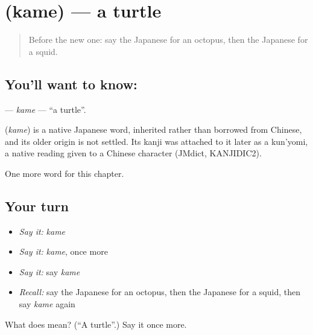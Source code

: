 \section[\texorpdfstring{\ja{かめ} (kame)}{かめ (kame)}]{ (kame) — a turtle}

\label{lesson:JA-C47-kame}



\begin{quote}
Before the new one: say the Japanese for an octopus, then the Japanese for a squid.
\end{quote}

\subsection*{You'll want to know: }
\textbf{} — \emph{kame} — \textquotedblleft{}a turtle\textquotedblright{}.

\begin{cousinweb}
\textbf{} (\emph{kame}) is a native Japanese word, inherited rather than borrowed from Chinese, and its older origin is not settled. Its kanji was attached to it later as a kun'yomi, a native reading given to a Chinese character (JMdict, KANJIDIC2).
\end{cousinweb}

\begin{grammarlens}[title={What you've built}]
One more word for this chapter.
\end{grammarlens}

\subsection*{Your turn}
\begin{itemize}
\raggedright
  \item \emph{Say it:} \emph{kame}
  \item \emph{Say it:} \emph{kame}, once more
  \item \emph{Say it:} say \emph{kame}
  \item \emph{Recall:} say the Japanese for an octopus, then the Japanese for a squid, then say \emph{kame} again
\end{itemize}

\begin{tcolorbox}[breakable,colback=teal!4,colframe=teal!35!black,title={Before you move on}]
What does  mean? (\textquotedblleft{}A turtle\textquotedblright{}.) Say it once more.
\end{tcolorbox}
